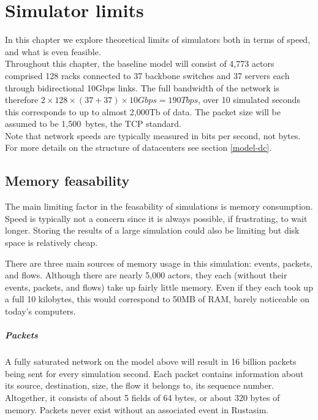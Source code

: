 \chapter{Simulator limits} \label{limits}

In this chapter we explore theoretical limits of simulators both in terms of speed, and what is even feasible.
\\

Throughout this chapter, the baseline model will consist of 4,773 actors comprised 128 racks connected to 37 backbone switches and 37 servers each through bidirectional 10Gbps links.
The full bandwidth of the network is therefore $2\times128\times(37+37)\times10Gbps = 190Tbps$, over 10 simulated seconds this corresponds to up to almost 2,000Tb of data.
The packet size will be assumed to be 1,500~bytes, the TCP standard. \\
Note that network speeds are typically measured in bits per second, not bytes.
For more details on the structure of datacenters see section \ref{model-dc}.

\section{Memory feasability} \label{limits-mem}

The main limiting factor in the feasability of simulations is memory consumption.
Speed is typically not a concern since it is always possible, if frustrating, to wait longer.
Storing the results of a large simulation could also be limiting but disk space is relatively cheap.

There are three main sources of memory usage in this simulation: events, packets, and flows.
Although there are nearly 5,000 actors, they each (without their events, packets, and flows) take up fairly little memory.
Even if they each took up a full 10 kilobytes, this would correspond to 50MB of RAM, barely noticeable on today's computers.

\paragraph{Packets}
A fully saturated network on the model above will result in 16 billion packets being sent for every simulation second.
Each packet contains information about its source, destination, size, the flow it belongs to, its sequence number.
Altogether, it consists of about 5 fields of 64 bytes, or about 320 bytes of memory.
Packets never exist without an associated event in Rustasim.


